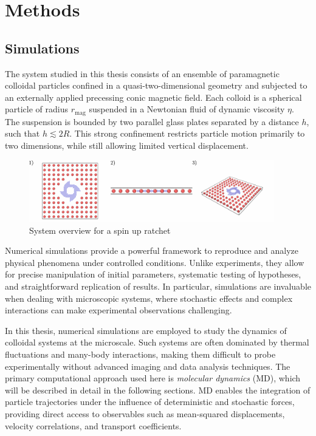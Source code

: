 \part{Methods}
\label{part:methods}

\chapter{Simulations}

The system studied in this thesis consists of an ensemble of paramagnetic colloidal particles confined in a quasi-two-dimensional geometry and subjected to an externally applied precessing conic magnetic field. Each colloid is a spherical particle of radius $r_{\mathrm{mag}}$ suspended in a Newtonian fluid of dynamic viscosity $\eta$. The suspension is bounded by two parallel glass plates separated by a distance $h$, such that $h \lesssim 2R$. This strong confinement restricts particle motion primarily to two dimensions, while still allowing limited vertical displacement. 

\begin{figure}
  \begin{center}
    \includegraphics[width=0.95\textwidth]{figures/system.pdf}
  \end{center}
  \caption[System overview.]{System overview for a spin up ratchet}\label{fig:system}
\end{figure}


Numerical simulations provide a powerful framework to reproduce and analyze physical phenomena under controlled conditions. Unlike experiments, they allow for precise manipulation of initial parameters, systematic testing of hypotheses, and straightforward replication of results. In particular, simulations are invaluable when dealing with microscopic systems, where stochastic effects and complex interactions can make experimental observations challenging. 

In this thesis, numerical simulations are employed to study the dynamics of colloidal systems at the microscale. Such systems are often dominated by thermal fluctuations and many-body interactions, making them difficult to probe experimentally without advanced imaging and data analysis techniques. The primary computational approach used here is \textit{molecular dynamics} (MD), which will be described in detail in the following sections. MD enables the integration of particle trajectories under the influence of deterministic and stochastic forces, providing direct access to observables such as mean-squared displacements, velocity correlations, and transport coefficients.

